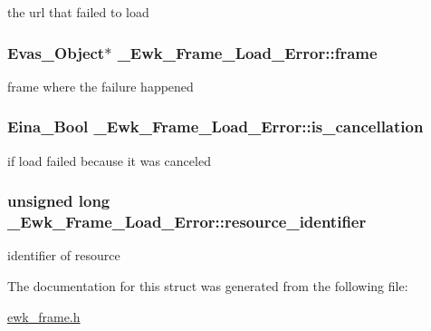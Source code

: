 the url that failed to load \hypertarget{struct__Ewk__Frame__Load__Error_aa95d535f8e3ae79ee2869fdd410d6db3}{
\subsubsection[{frame}]{\setlength{\rightskip}{0pt plus 5cm}Evas\+\_\+\+Object$\ast$ \+\_\+\+Ewk\+\_\+\+Frame\+\_\+\+Load\+\_\+\+Error\+::frame}}\label{struct__Ewk__Frame__Load__Error_aa95d535f8e3ae79ee2869fdd410d6db3}
frame where the failure happened \hypertarget{struct__Ewk__Frame__Load__Error_a4a0b006829bd4c47d146aaa248e5bf00}{
\subsubsection[{is\+\_\+cancellation}]{\setlength{\rightskip}{0pt plus 5cm}Eina\+\_\+\+Bool \+\_\+\+Ewk\+\_\+\+Frame\+\_\+\+Load\+\_\+\+Error\+::is\+\_\+cancellation}}\label{struct__Ewk__Frame__Load__Error_a4a0b006829bd4c47d146aaa248e5bf00}
if load failed because it was canceled \hypertarget{struct__Ewk__Frame__Load__Error_abe4b75c6837e5286e6ce93e5faa4f1f7}{
\subsubsection[{resource\+\_\+identifier}]{\setlength{\rightskip}{0pt plus 5cm}unsigned long \+\_\+\+Ewk\+\_\+\+Frame\+\_\+\+Load\+\_\+\+Error\+::resource\+\_\+identifier}}\label{struct__Ewk__Frame__Load__Error_abe4b75c6837e5286e6ce93e5faa4f1f7}
identifier of resource 

The documentation for this struct was generated from the following file\+:\begin{DoxyCompactItemize}
\item 
\hyperlink{ewk__frame_8h}{ewk\+\_\+frame.\+h}\end{DoxyCompactItemize}
